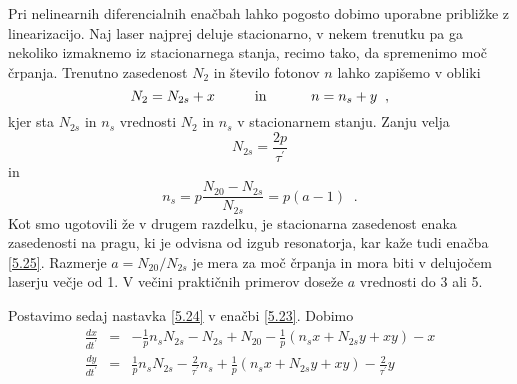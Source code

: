 Pri nelinearnih diferencialnih enačbah lahko pogosto dobimo upora\-bne
približke z linearizacijo. Naj laser najprej deluje stacionarno, v nekem
trenutku pa ga nekoliko izmaknemo iz stacionarnega stanja, recimo tako, da
spremenimo moč črpanja. Trenutno zasedenost $N_2$ in število fotonov $n$
lahko zapišemo v obliki 
\begin{equation}  \label{5.24}
N_2= N_{2s}+x \mbox{\hskip 1cm in \hskip 1cm} n=n_s+y\;\;,
\end{equation}
kjer sta $N_{2s}$ in $n_s$ vrednosti $N_2$ in $n_s$ v stacionarnem stanju.
Zanju velja 
\begin{equation}  \label{5.25}
N_{2s}=\frac{2p}{\tau^{\prime}}
\end{equation}
in 
\begin{equation}  \label{5.26}
n_s=p\frac{N_{20}-N_{2s}}{N_{2s}}=p(a-1)\;\;.
\end{equation}
Kot smo ugotovili že v drugem razdelku, je stacionarna zasedenost enaka
zasedenosti na pragu, ki je odvisna od izgub resonatorja, kar kaže tudi
enačba \ref{5.25}. Razmerje $a=N_{20}/N_{2s}$ je mera za moč črpanja in
mora biti v delujočem laserju večje od 1. V večini praktičnih primerov
doseže $a$ vrednosti do 3 ali 5.

Postavimo sedaj nastavka \ref{5.24} v enačbi \ref{5.23}. Dobimo 
\begin{eqnarray}  \label{5.27}
\frac{d x}{d t^{\prime}} &=&-\frac{1}{p}n_sN_{2s}-N_{2s}+N_{20}- \frac{1}{p}
(n_sx+N_{2s}y+xy)-x \\
\frac{d y}{d t^{\prime}} &=& \frac{1}{p}n_sN_{2s}-\frac{2}{\tau^{\prime}}n_s
+ \frac{1}{p}(n_s x+N_{2s} y+xy)-\frac{2}{\tau^{\prime}}y
\end{eqnarray}

